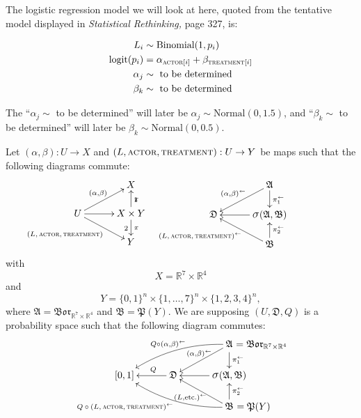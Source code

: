 \documentclass[
twoside=true,
paper=letter,
fontsize=9pt,
pagesize=auto,
leqno,
openany,
headsepline,
overfullrule,
]{scrbook}
\theoremstyle{plain}
\theoremstyle{plain}
\theoremstyle{definition}
\theoremstyle{bfnoteitalic}
\theoremstyle{bfnoteroman}
\newcommand{\sigalg}[1]{\mathfrak{#1}}
\newcommand{\borel}{\mathfrak{Bor}}
\newcommand{\sagb}{\mathop{\hbox{\large{$\sigma$}}}\nolimits}
\newcommand{\preimage}[1]{#1^{\leftarrow}}
\newcommand{\R}{\mathbb{R}}
\newcommand{\productsig}[2]{\sagb(#1,#2)}
\newcommand{\powerset}{\mathfrak{P}}
\newcommand{\measurespace}{X}
\newcommand{\measurespaceii}{Y}
\newcommand{\projectionone}{\pi_1}
\newcommand{\projectiontwo}{\pi_2}
\newcommand{\pspace}{\measurespace}%
\newcommand{\sspace}{\measurespaceii}%
\newcommand{\sspacesig}{\sigalg{B}}
\newcommand{\pspacesig}{\sigalg{A}}
\begin{document}
The logistic regression model we will look at here, 
quoted from the tentative model displayed in \textsl{Statistical Rethinking,} page 327, is:
\begin{quoting}\small
\begin{align*}
L_i & \sim \text{Binomial}(1,p_i) \\
\text{logit}(p_i) & = \alpha_{\textsc{actor}[i]} + \beta_{\textsc{treatment}[i]} \\
\alpha_j & \sim \text{ to be determined} \\
\beta_k & \sim \text{ to be determined} \\
\end{align*}
\end{quoting}
The ``$\alpha_j \sim$  to be determined'' will later be
$\alpha_j  \sim \text{Normal}(0,1.5)$, and
``$\beta_k  \sim$ to be determined'' will later be
$\beta_k  \sim \text{Normal}(0,0.5)$.


Let  $(\alpha, \beta):U\to\pspace$ and $(L,\textsc{actor}, \textsc{treatment}):U\to\sspace$ 
be maps such that the following diagrams commute:
\[
\xymatrix@R=16pt@C=30pt{ 
 & \pspace 
 \\
 U \ar[ur]^{(\alpha, \beta)} 
 \ar[dr]_{\llap{\scriptsize{$(L,\textsc{actor}, \textsc{treatment})$}}}
 \ar[r] & 
 \pspace\times\sspace \ar[u]_\projectionone \ar[d]^\projectiontwo
 \\
  & \sspace \\
}
%
\hspace{60pt}
%
\xymatrix@R=16pt@C=30pt{ 
 & \pspacesig
 \ar[dl]_{\preimage{(\alpha,\beta)}} 
 \ar[d]^{\preimage{\projectionone}}
 \\
 \sigalg{D}  & 
 \productsig{\pspacesig}{\sspacesig} 
 \ar[l]  
 \\
  & \sspacesig
  \ar[u]_{\preimage{\projectiontwo}}
  \ar[ul]^{\preimage{\llap{\scriptsize{$(L,\textsc{actor}, \textsc{treatment})$}}}}
  \\
}
\]
with
\[
\pspace = \R^7 \times \R^4
\]
and
\[
\sspace =
\{0,1\}^n \times \{ 1,\ldots,7 \}^n \times \{1,2,3,4 \}^n,
\]
where 
$\pspacesig = \borel_{\R^7 \times \R^4}$ and $\sspacesig=\powerset(\sspace)$.
We are supposing $(U,\sigalg{D},Q)$ is a probability space such that the following diagram commutes:
\[
\xymatrix@R=16pt@C=30pt{ 
 & & \pspacesig \rlap{ $=\borel_{\R^7\times\R^4}$}
 \ar[dl]_{\kern30pt\preimage{(\alpha,\beta)}} 
 \ar[d]^{\preimage{\projectionone}}
 \ar@/_10pt/[lld]_{Q\circ \preimage{(\alpha,\beta)}}
 \\
 [0,1] & \sigalg{D} \ar[l]_-{\ Q} & 
 \productsig{\pspacesig}{\sspacesig} 
 \ar[l]  
 \\
 & & \sspacesig \rlap{ $=\powerset(\sspace)$}
  \ar[u]_{\preimage{\projectiontwo}}
  \ar[ul]^{\preimage{(L,\text{etc.})}}
  \ar@/^10pt/[llu]^{\llap{\scriptsize{$Q\circ\preimage{(L,\textsc{actor},\textsc{treatment})}$}}}
  \\
}
\]
\end{document}
